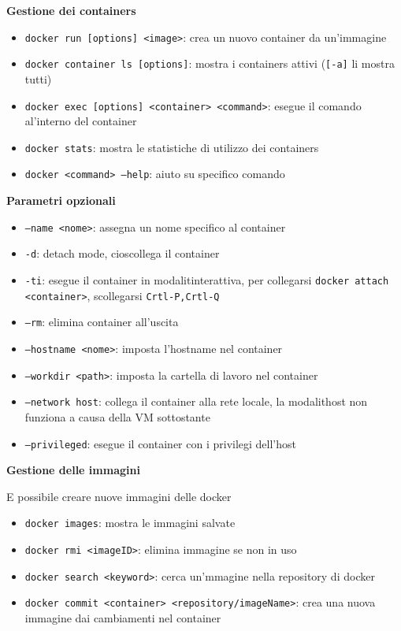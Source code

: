 \begin{flushleft}
  \textbf{Gestione dei containers} \par 
  \begin{itemize}
    \item \texttt{docker run [options] <image>}: crea un nuovo container da un'immagine 
    \item \texttt{docker container ls [options]}: mostra i containers attivi (\texttt{[-a]} li mostra tutti)
    \item \texttt{docker exec [options] <container> <command>}: esegue il comando al'interno del container
    \item \texttt{docker stats}: mostra le statistiche di utilizzo dei containers
    \item \texttt{docker <command> --help}: aiuto su specifico comando
  \end{itemize}
  \textbf{Parametri opzionali}
  \begin{itemize}
    \item \texttt{--name <nome>}: assegna un nome specifico al container
    \item \texttt{-d}: detach mode, cio\ace scollega il container
    \item \texttt{-ti}: esegue il container in modalit\aca interattiva, per collegarsi \texttt{docker attach <container>}, scollegarsi \texttt{Crtl-P,Crtl-Q}
    \item \texttt{--rm}: elimina container all'uscita
    \item \texttt{--hostname <nome>}: imposta l'hostname nel container
    \item \texttt{--workdir <path>}: imposta la cartella di lavoro nel container
    \item \texttt{--network host}: collega il container alla rete locale, la modalit\aca host non funziona a causa della VM sottostante
    \item \texttt{--privileged}: esegue il container con i privilegi dell'host
  \end{itemize}
\end{flushleft}
\begin{flushleft}
  \textbf{Gestione delle immagini}\par 
  \ac{E} possibile creare nuove immagini delle docker
  \begin{itemize}
    \item \texttt{docker images}: mostra le immagini salvate
    \item \texttt{docker rmi <imageID>}: elimina immagine se non in uso
    \item \texttt{docker search <keyword>}: cerca un'mmagine nella repository di docker
    \item \texttt{docker commit <container> <repository/imageName>}: crea una nuova immagine dai 
          cambiamenti nel container
  \end{itemize}
\end{flushleft}

